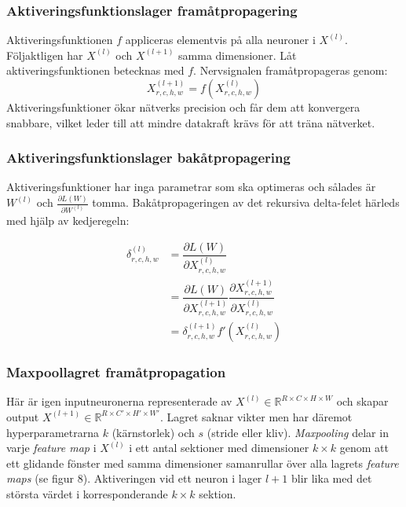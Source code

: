 \documentclass[a4paper,11pt,twoside]{article}
\newcommand*{\pd}[2]{\ensuremath{\dfrac{\partial #1}{\partial #2}}}
\newcommand*{\inpd}[2]{\ensuremath{\frac{\partial #1}{\partial #2}}}
\begin{document}
\subsubsection{Aktiveringsfunktionslager framåtpropagering}
Aktiveringsfunktionen $f$ appliceras elementvis på alla neuroner i $X^{(l)}$. Följaktligen har $X^{(l)}$ och $X^{(l+1)}$ samma dimensioner. Låt aktiveringsfunktionen betecknas med $f$. Nervsignalen framåtpropageras genom: \cite{convmath}
\begin{equation}
X^{(l+1)}_{r,c,h,w} = f(X^{(l)}_{r,c,h,w})
\end{equation}
Aktiveringsfunktioner ökar nätverks precision och får dem att konvergera snabbare, vilket leder till att mindre datakraft krävs för att träna nätverket. \cite{cs231n}

\subsubsection{Aktiveringsfunktionslager bakåtpropagering}
Aktiveringsfunktioner har inga parametrar som ska optimeras och sålades är $W^{(l)}$ och $\inpd{L(W)}{W^{(l)}}$ tomma. Bakåtpropageringen av det rekursiva delta-felet härleds med hjälp av kedjeregeln: \cite{cs231n} \cite{convmath}

\begin{equation}
\begin{split}
\delta^{(l)}_{r,c,h,w}
		& = \pd{L(W)}{X^{(l)}_{r,c,h,w}} \\
		& = \pd{L(W)}{X^{(l+1)}_{r,c,h,w}} \pd{X^{(l+1)}_{r,c,h,w}}{X^{(l)}_{r,c,h,w}} \\
		& = \delta^{(l+1)}_{r,c,h,w} f'(X^{(l)}_{r,c,h,w})
\end{split}
\end{equation}

\subsubsection{Maxpoollagret framåtpropagation}
Här är igen inputneuronerna representerade av $X^{(l)} \in \mathbb{R}^{R \times C \times H \times W}$ och skapar output $X^{(l+1)} \in \mathbb{R}^{R \times C' \times H' \times W'}$. Lagret saknar vikter men har däremot hyperparametrarna $k$ (kärnstorlek) och $s$ (stride eller kliv). \textit{Maxpooling} delar in varje \textit{feature map} i $X^{(l)}$ i ett antal sektioner med dimensioner $k \times k$ genom att ett glidande fönster med samma dimensioner samanrullar över alla lagrets \textit{feature maps} (se figur 8). Aktiveringen vid ett neuron i lager $l+1$ blir lika med det största värdet i korresponderande $k \times k$ sektion. \cite{cs231n} \cite{convmath} \cite{convarithmetic}
\end{document}
